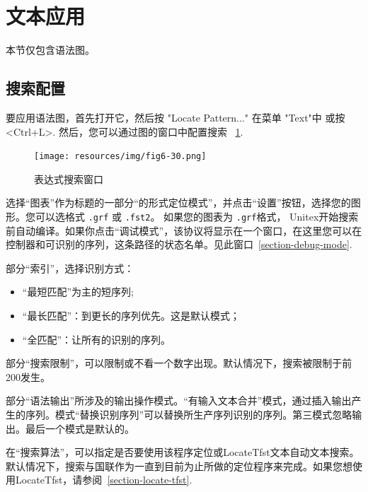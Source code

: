 \section{文本应用}
\label{section-applying-graphs-to-text}
本节仅包含语法图。
\subsection{搜索配置}
要应用语法图，首先打开它，然后按 "Locate
Pattern..." 在菜单 "Text"中 或按 <Ctrl+L>. 然后，您可以通过图的窗口中配置搜索
~\ref{fig-regexp-frame}.

\begin{figure}[!h]
\begin{center}
\texttt{[image: resources/img/fig6-30.png]}
\caption{表达式搜索窗口\label{fig-regexp-frame}}
\end{center}
\end{figure}

\noindent 选择“图表”作为标题的一部分“的形式定位模式”，并点击“设置”按钮，选择您的图形。您可以选格式 \verb+.grf+ 或 \verb+.fst2+。 如果您的图表为 \verb+.grf+格式， Unitex开始搜索前自动编译。如果你点击“调试模式”，该协议将显示在一个窗口，在这里您可以在控制器和可识别的序列，这条路径的状态名单。见此窗口~\ref{section-debug-mode}.

\bigskip
\noindent 部分“索引”，选择识别方式：

\begin{itemize}
  \item “最短匹配”为主的短序列;
  \item “最长匹配”：到更长的序列优先。这是默认模式；
  \item “全匹配”：让所有的识别的序列。
\end{itemize}

\noindent 
部分“搜索限制”，可以限制或不看一个数字出现。默认情况下，搜索被限制于前200发生。

\bigskip
{}
\noindent 
部分“语法输出”所涉及的输出操作模式。“有输入文本合并”模式，通过插入输出产生的序列。模式“替换识别序列”可以替换所生产序列识别的序列。第三模式忽略输出。最后一个模式是默认的。

\bigskip
\noindent

在“搜索算法”，可以指定是否要使用该程序定位或LocateTfst文本自动文本搜索。默认情况下，搜索与国联作为一直到目前为止所做的定位程序来完成。如果您想使用LocateTfst，请参阅~\ref{section-locate-tfst}.

